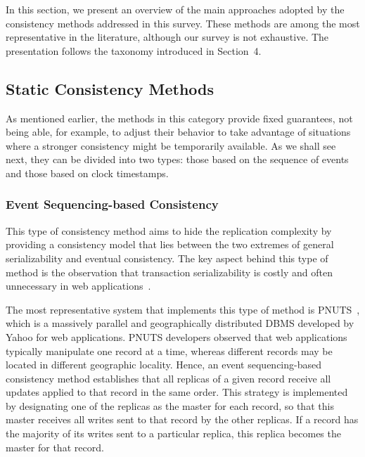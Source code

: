 In this section, we present an overview of 
the main approaches adopted %
by the consistency methods addressed in this survey. These methods are among the most representative in the literature, although our survey is not exhaustive. The presentation follows the taxonomy introduced in Section~4. 
\vspace{1mm}

\subsection{Static Consistency Methods}

As mentioned earlier, the methods in this category provide fixed guarantees, not being able, for example, to adjust their behavior to take advantage of situations where a stronger consistency might be temporarily available. {\al As we shall see next,} {\dg they can be divided into two types: those based on the sequence of events and those based on clock timestamps.} %
\vspace{1mm}

\subsubsection{Event Sequencing-based Consistency}

This type of consistency method aims to hide the replication complexity by providing a consistency model that lies between the two extremes of general serializability and eventual consistency. The key aspect behind this type of method is the observation that 
transaction serializability is costly and often unnecessary in web applications~\cite{cooper2008pnuts}.

The most representative system that implements this type of method is PNUTS~\cite{cooper2008pnuts}, which is a massively parallel and geographically distributed DBMS developed by Yahoo for web applications. PNUTS developers observed that web applications typically manipulate one record at a time, whereas different records may be located in different geographic locality. Hence, an event sequencing-based consistency method establishes that all replicas of a given record receive all updates applied to that record in the same order. This strategy is implemented by designating one of the replicas as the master for each record, so that this master receives all writes sent to that record by the other replicas. If a record has the majority of its writes sent to a particular replica, this replica becomes the master for that record.
\vspace{1mm}

